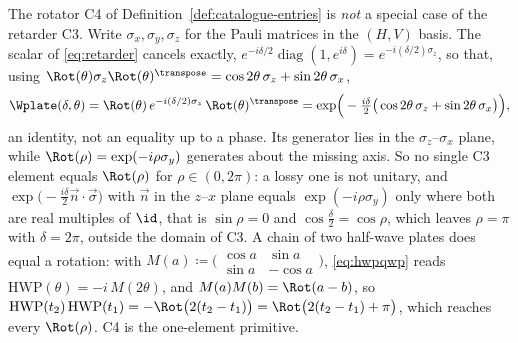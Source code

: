 
\begin{remark}\label{rem:rotator}
The rotator C4 of Definition~\ref{def:catalogue-entries} is \emph{not} a
special case of the retarder C3. Write $\sigma_x,\sigma_y,\sigma_z$ for the
Pauli matrices in the $(H,V)$ basis. The scalar of \eqref{eq:retarder}
cancels exactly,
$e^{-i\delta/2}\operatorname{diag}(1,e^{i\delta})=e^{-i(\delta/2)\sigma_z}$,
so that, using
$\Rot(\theta)\sigma_z\Rot(\theta)^{\transpose}
=\cos2\theta\,\sigma_z+\sin2\theta\,\sigma_x$,
\begin{equation}\label{eq:retgen}
  \Wplate(\delta,\theta)
  =\Rot(\theta)\,e^{-i(\delta/2)\sigma_z}\,\Rot(\theta)^{\transpose}
  =\exp\!\Big(-\tfrac{i\delta}{2}
    \big(\cos2\theta\,\sigma_z+\sin2\theta\,\sigma_x\big)\Big),
\end{equation}
an identity, not an equality up to a phase. Its generator lies in the
$\sigma_z$--$\sigma_x$ plane, while $\Rot(\rho)=\exp(-i\rho\sigma_y)$ generates
about the missing axis. So no single C3 element equals $\Rot(\rho)$ for
$\rho\in(0,2\pi)$: a lossy one is not unitary, and
$\exp\big(-\tfrac{i\delta}{2}\vec n\cdot\vec\sigma\big)$ with $\vec n$ in the
$z$--$x$ plane equals $\exp(-i\rho\sigma_y)$ only where both are real
multiples of $\id$, that is $\sin\rho=0$ and $\cos\tfrac\delta2=\cos\rho$,
which leaves $\rho=\pi$ with $\delta=2\pi$, outside the domain of C3. A chain
of two half-wave plates does equal a rotation: with
$M(a)\coloneqq\big(\begin{smallmatrix}\cos a&\sin a\\
\sin a&-\cos a\end{smallmatrix}\big)$, \eqref{eq:hwpqwp} reads
$\mathrm{HWP}(\theta)=-i\,M(2\theta)$, and $M(a)M(b)=\Rot(a-b)$, so
$\mathrm{HWP}(t_2)\,\mathrm{HWP}(t_1)=-\Rot\big(2(t_2-t_1)\big)
=\Rot\big(2(t_2-t_1)+\pi\big)$, which reaches every $\Rot(\rho)$. C4 is the
one-element primitive.
\end{remark}
